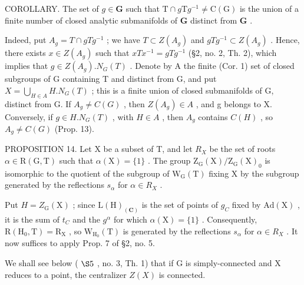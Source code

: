 COROLLARY. The set of \(g \in \mathbf{G}\) such that \(\mathrm{T} \cap g\mathrm{T}g^{-1} \neq \mathrm{C}(\mathrm{G})\) is the union of a finite number of closed analytic submanifolds of \(\mathbf{G}\) distinct from \(\mathbf{G}\) .

Indeed, put \(A_{g} = T \cap gTg^{-1}\) ; we have \(T \subset Z(A_{g})\) and \(gTg^{-1} \subset Z(A_{g})\) . Hence, there exists \(x \in Z(A_{g})\) such that \(xTx^{-1} = gTg^{-1}\) (§2, no. 2, Th. 2), which implies that \(g \in Z(A_{g}).N_{G}(T)\) . Denote by A the finite (Cor. 1) set of closed subgroups of G containing T and distinct from G, and put \(X = \bigcup_{H \in A} H.N_{G}(T)\) ; this is a finite union of closed submanifolds of G, distinct from G. If \(A_{g} \neq C(G)\) , then \(Z(A_{g}) \in A\) , and g belongs to X. Conversely, if \(g \in H.N_{G}(T)\) , with \(H \in A\) , then \(A_{g}\) contains \(C(H)\) , so \(A_{g} \neq C(G)\) (Prop. 13).

PROPOSITION 14. Let X be a subset of T, and let \(R_{X}\) be the set of roots \(\alpha \in \mathrm{R}(\mathrm{G}, \mathrm{T})\) such that \(\alpha(\mathrm{X}) = \{1\}\) . The group \(\mathrm{Z}_{\mathrm{G}}(\mathrm{X}) / \mathrm{Z}_{\mathrm{G}}(\mathrm{X})_{0}\) is isomorphic to the quotient of the subgroup of \(\mathrm{W}_{\mathrm{G}}(\mathrm{T})\) fixing X by the subgroup generated by the reflections \(s_{\alpha}\) for \(\alpha \in R_{X}\) .

Put \(H = Z_{\mathrm{G}}(\mathrm{X})\) ; since \(\mathrm{L}(\mathrm{H})_{(\mathbf{C})}\) is the set of points of \(g_{C}\) fixed by \(\mathrm{Ad}(\mathrm{X})\) , it is the sum of \(t_{C}\) and the \(g^{\alpha}\) for which \(\alpha(\mathrm{X}) = \{1\}\) . Consequently, \(\mathrm{R}(\mathrm{H}_{0}, \mathrm{T}) = \mathrm{R}_{\mathrm{X}}\) , so \(\mathrm{W}_{\mathrm{H}_{0}}(\mathrm{T})\) is generated by the reflections \(s_{\alpha}\) for \(\alpha \in R_{X}\) . It now suffices to apply Prop. 7 of §2, no. 5.

We shall see below ( \(\S5\) , no. 3, Th. 1) that if G is simply-connected and X reduces to a point, the centralizer \(Z(X)\) is connected.

